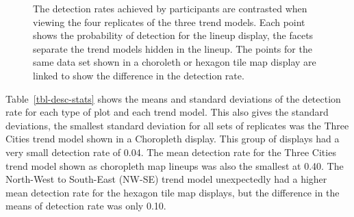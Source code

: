 \documentclass[
doublespace,
  times]{anzsauth}
\begin{document}
\begin{figure}


\caption{\label{fig-detect-compare}The detection rates achieved by
participants are contrasted when viewing the four replicates of the
three trend models. Each point shows the probability of detection for
the lineup display, the facets separate the trend models hidden in the
lineup. The points for the same data set shown in a choroleth or hexagon
tile map display are linked to show the difference in the detection
rate.}

\end{figure}%

Table~\ref{tbl-desc-stats} shows the means and standard deviations of
the detection rate for each type of plot and each trend model. This also
gives the standard deviations, the smallest standard deviation for all
sets of replicates was the Three Cities trend model shown in a
Choropleth display. This group of displays had a very small detection
rate of 0.04. The mean detection rate for the Three Cities trend model
shown as choropleth map lineups was also the smallest at 0.40. The
North-West to South-East (NW-SE) trend model unexpectedly had a higher
mean detection rate for the hexagon tile map displays, but the
difference in the means of detection rate was only 0.10.
\end{document}

